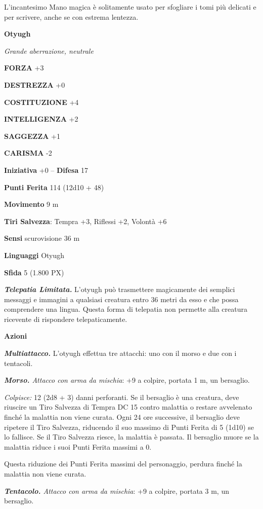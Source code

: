 \begin{multicols}{2}
L'incantesimo Mano magica è solitamente usato per sfogliare i tomi più delicati e per scrivere, anche se con estrema lentezza.

\medskip{}\textbf{Otyugh}

\textit{Grande aberrazione, neutrale}

\textbf{FORZA} +3

\textbf{DESTREZZA} +0

\textbf{COSTITUZIONE} +4

\textbf{INTELLIGENZA} +2

\textbf{SAGGEZZA} +1

\textbf{CARISMA} -2

\textbf{Iniziativa} +0 -- \textbf{Difesa} 17

\textbf{Punti Ferita} 114 (12d10 + 48)

\textbf{Movimento} 9 m

\textbf{Tiri Salvezza}: Tempra +3, Riflessi +2, Volontà +6

\textbf{Sensi} scurovisione 36 m

\textbf{Linguaggi} Otyugh

\textbf{Sfida} 5 (1.800 PX)

\textit{\textbf{Telepatia Limitata.}} L'otyugh può trasmettere magicamente dei semplici messaggi e immagini a qualsiasi creatura entro 36 metri da esso e che possa comprendere una lingua. Questa forma di telepatia non permette alla creatura ricevente di rispondere telepaticamente.

\textbf{Azioni}

\textit{\textbf{Multiattacco.}} L'otyugh effettua tre attacchi: uno con il morso e due con i tentacoli.

\textit{\textbf{Morso.} Attacco con arma da mischia}: +9 a colpire, portata 1 m, un bersaglio.

\textit{Colpisce:} 12 (2d8 + 3) danni perforanti. Se il bersaglio è una creatura, deve riuscire un Tiro Salvezza di Tempra DC 15 contro malattia o restare avvelenato finché la malattia non viene curata. Ogni 24 ore successive, il bersaglio deve ripetere il Tiro Salvezza, riducendo il suo massimo di Punti Ferita di 5 (1d10) se lo fallisce. Se il Tiro Salvezza riesce, la malattia è passata. Il bersaglio muore se la malattia riduce i suoi Punti Ferita massimi a 0.

Questa riduzione dei Punti Ferita massimi del personaggio, perdura finché la malattia non viene curata.

\textit{\textbf{Tentacolo.} Attacco con arma da mischia}: +9 a colpire, portata 3 m, un bersaglio.


\end{multicols}
